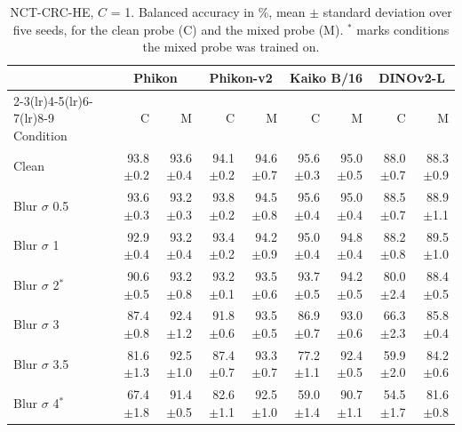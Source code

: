 \begin{table}[H]\centering\small
\caption{NCT-CRC-HE, $C$ = 1. Balanced accuracy in \%, mean $\pm$ standard deviation over five seeds, for the clean probe (C) and the mixed probe (M). $^{*}$ marks conditions the mixed probe was trained on.}
\label{tab:app1}
\setlength{\tabcolsep}{3.5pt}
\begin{tabular}{lrrrrrrrr}
\toprule
 & \multicolumn{2}{c}{Phikon} & \multicolumn{2}{c}{Phikon-v2} & \multicolumn{2}{c}{Kaiko B/16} & \multicolumn{2}{c}{DINOv2-L} \\
\cmidrule(lr){2-3}\cmidrule(lr){4-5}\cmidrule(lr){6-7}\cmidrule(lr){8-9}
Condition & C & M & C & M & C & M & C & M \\
\midrule
Clean & 93.8{\scriptsize$\pm$0.2} & 93.6{\scriptsize$\pm$0.4} & 94.1{\scriptsize$\pm$0.2} & 94.6{\scriptsize$\pm$0.7} & 95.6{\scriptsize$\pm$0.3} & 95.0{\scriptsize$\pm$0.5} & 88.0{\scriptsize$\pm$0.7} & 88.3{\scriptsize$\pm$0.9} \\
\addlinespace
Blur $\sigma$ 0.5 & 93.6{\scriptsize$\pm$0.3} & 93.2{\scriptsize$\pm$0.3} & 93.8{\scriptsize$\pm$0.2} & 94.5{\scriptsize$\pm$0.8} & 95.6{\scriptsize$\pm$0.4} & 95.0{\scriptsize$\pm$0.4} & 88.5{\scriptsize$\pm$0.7} & 88.9{\scriptsize$\pm$1.1} \\
Blur $\sigma$ 1 & 92.9{\scriptsize$\pm$0.4} & 93.2{\scriptsize$\pm$0.4} & 93.4{\scriptsize$\pm$0.2} & 94.2{\scriptsize$\pm$0.9} & 95.0{\scriptsize$\pm$0.4} & 94.8{\scriptsize$\pm$0.4} & 88.2{\scriptsize$\pm$0.8} & 89.5{\scriptsize$\pm$1.0} \\
Blur $\sigma$ 2$^{*}$ & 90.6{\scriptsize$\pm$0.5} & 93.2{\scriptsize$\pm$0.8} & 93.2{\scriptsize$\pm$0.1} & 93.5{\scriptsize$\pm$0.6} & 93.7{\scriptsize$\pm$0.5} & 94.2{\scriptsize$\pm$0.5} & 80.0{\scriptsize$\pm$2.4} & 88.4{\scriptsize$\pm$0.5} \\
Blur $\sigma$ 3 & 87.4{\scriptsize$\pm$0.8} & 92.4{\scriptsize$\pm$1.2} & 91.8{\scriptsize$\pm$0.6} & 93.5{\scriptsize$\pm$0.5} & 86.9{\scriptsize$\pm$0.7} & 93.0{\scriptsize$\pm$0.6} & 66.3{\scriptsize$\pm$2.3} & 85.8{\scriptsize$\pm$0.4} \\
Blur $\sigma$ 3.5 & 81.6{\scriptsize$\pm$1.3} & 92.5{\scriptsize$\pm$1.0} & 87.4{\scriptsize$\pm$0.7} & 93.3{\scriptsize$\pm$0.7} & 77.2{\scriptsize$\pm$1.1} & 92.4{\scriptsize$\pm$0.5} & 59.9{\scriptsize$\pm$2.0} & 84.2{\scriptsize$\pm$0.6} \\
Blur $\sigma$ 4$^{*}$ & 67.4{\scriptsize$\pm$1.8} & 91.4{\scriptsize$\pm$0.5} & 82.6{\scriptsize$\pm$1.1} & 92.5{\scriptsize$\pm$1.0} & 59.0{\scriptsize$\pm$1.4} & 90.7{\scriptsize$\pm$1.1} & 54.5{\scriptsize$\pm$1.7} & 81.6{\scriptsize$\pm$0.8} \\

\end{tabular}
\end{table}
